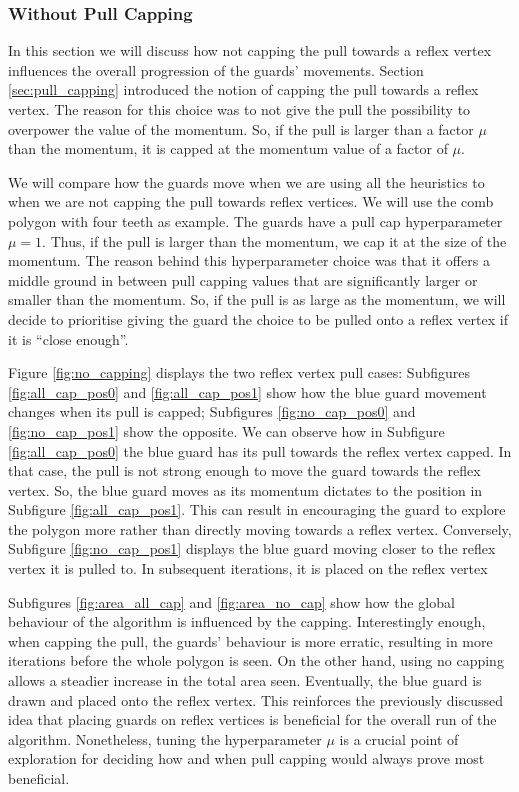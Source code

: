\subsubsection{Without Pull Capping}
In this section we will discuss how not capping the pull towards a reflex vertex influences the overall progression of the guards' movements. Section \ref{sec:pull_capping} introduced the notion of capping the pull towards a reflex vertex. The reason for this choice was to not give the pull the possibility to overpower the value of the momentum. So, if the pull is larger than a factor $\mu$ than the momentum, it is capped at the momentum value of a factor of $\mu$. 

We will compare how the guards move when we are using all the heuristics to when we are not capping the pull towards reflex vertices. We will use the comb polygon with four teeth as example. The guards have a pull cap hyperparameter $\mu = 1$. Thus, if the pull is larger than the momentum, we cap it at the size of the momentum. The reason behind this hyperparameter choice was that it offers a middle ground in between pull capping values that are significantly larger or smaller than the momentum. So, if the pull is as large as the momentum, we will decide to prioritise giving the guard the choice to be pulled onto a reflex vertex if it is ``close enough''.

Figure \ref{fig:no_capping} displays the two reflex vertex pull cases: Subfigures \ref{fig:all_cap_pos0} and \ref{fig:all_cap_pos1} show how the blue guard movement changes when its pull is capped; Subfigures \ref{fig:no_cap_pos0} and \ref{fig:no_cap_pos1} show the opposite. We can observe how in Subfigure \ref{fig:all_cap_pos0} the blue guard has its pull towards the reflex vertex capped. In that case, the pull is not strong enough to move the guard towards the reflex vertex. So, the blue guard moves as its momentum dictates to the position in Subfigure \ref{fig:all_cap_pos1}. This can result in encouraging the guard to explore the polygon more rather than directly moving towards a reflex vertex.
Conversely, Subfigure \ref{fig:no_cap_pos1} displays the blue guard moving closer to the reflex vertex it is pulled to. In subsequent iterations, it is placed on the reflex vertex

Subfigures \ref{fig:area_all_cap} and \ref{fig:area_no_cap} show how the global behaviour of the algorithm is influenced by the capping. Interestingly enough, when capping the pull, the guards' behaviour is more erratic, resulting in more iterations before the whole polygon is seen. On the other hand, using no capping allows a steadier increase in the total area seen. Eventually, the blue guard is drawn and placed onto the reflex vertex. This reinforces the previously discussed idea that placing guards on reflex vertices is beneficial for the overall run of the algorithm. Nonetheless, tuning the hyperparameter $\mu$ is a crucial point of exploration for deciding how and when pull capping would always prove most beneficial.


